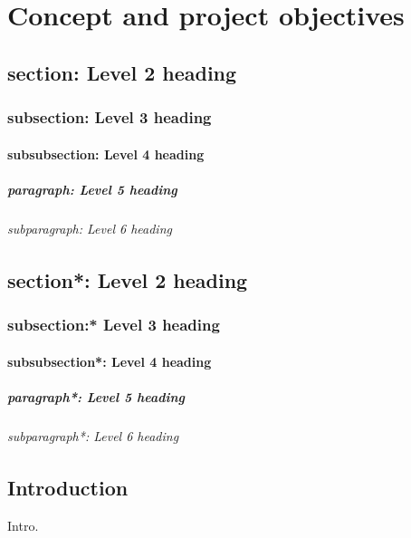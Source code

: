 

\chapter{Concept and project objectives}

\section{section: Level 2 heading}
\subsection{subsection: Level 3 heading}
\subsubsection{subsubsection: Level 4 heading}
\paragraph{paragraph: Level 5 heading}
\subparagraph{subparagraph: Level 6 heading}

\section*{section*: Level 2 heading}
\subsection*{subsection:* Level 3 heading}
\subsubsection*{subsubsection*: Level 4 heading}
\paragraph*{paragraph*: Level 5 heading}
\subparagraph*{subparagraph*: Level 6 heading}

\section{Introduction}
Intro.

